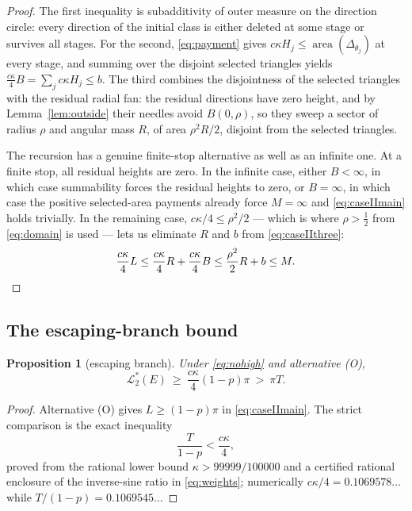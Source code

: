 \documentclass[11pt]{article}
\theoremstyle{plain}
\newtheorem{proposition}[theorem]{Proposition}
\theoremstyle{definition}
\theoremstyle{remark}
\newcommand{\Lout}{\mathcal{L}^{*}_{2}}
\begin{document}
\begin{proof}
The first inequality is subadditivity of outer measure on the direction circle:
every direction of the initial class is either deleted at some stage or survives
all stages. For the second, \eqref{eq:payment} gives
$c\kappa H_{j}\le\operatorname{area}(\Delta_{\theta_{j}})$ at every stage, and
summing over the disjoint selected triangles yields
$\tfrac{c\kappa}{4}B=\sum_{j}c\kappa H_{j}\le b$. The third combines the disjointness of the
selected triangles with the residual radial fan: the residual directions have
zero height, and by Lemma~\ref{lem:outside} their needles avoid $B(0,\rho)$, so
they sweep a sector of radius $\rho$ and angular mass $R$, of area
$\rho^{2}R/2$, disjoint from the selected triangles.

The recursion has a genuine finite-stop alternative as well as an infinite one.
At a finite stop, all residual heights are zero. In the infinite case, either
$B<\infty$, in which case summability forces the residual heights to zero, or
$B=\infty$, in which case the positive selected-area payments already force
$M=\infty$ and \eqref{eq:caseIImain} holds trivially. In the remaining case,
$c\kappa/4\le\rho^{2}/2$ --- which is where $\rho>\tfrac12$ from
\eqref{eq:domain} is used --- lets us eliminate $R$ and $b$ from
\eqref{eq:caseIIthree}:
\[
  \frac{c\kappa}{4}L\le\frac{c\kappa}{4}R+\frac{c\kappa}{4}B
  \le\frac{\rho^{2}}{2}R+b\le M . \qedhere
\]
\end{proof}

\subsection{The escaping-branch bound}

\begin{proposition}[escaping branch]\label{prop:caseII}
Under \eqref{eq:nohigh} and alternative (O),
\[
  \Lout(E)\ \ge\ \frac{c\kappa}{4}(1-p)\pi\ >\ \pi T .
\]
\end{proposition}

\begin{proof}
Alternative (O) gives $L\ge(1-p)\pi$ in \eqref{eq:caseIImain}. The strict
comparison is the exact inequality
\[
  \frac{T}{1-p}<\frac{c\kappa}{4},
\]
proved from the rational lower bound $\kappa>99999/100000$ and a certified
rational enclosure of the inverse-sine ratio in \eqref{eq:weights};
numerically $c\kappa/4=0.1069578\ldots$ while $T/(1-p)=0.1069545\ldots$
\end{proof}
\end{document}

